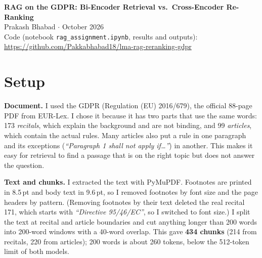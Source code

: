 \documentclass[10pt,a4paper]{article}
\newcommand{\q}[1]{\textit{``#1''}}
\begin{document}
\begin{center}
{\Large\bfseries RAG on the GDPR: Bi-Encoder Retrieval vs.\ Cross-Encoder Re-Ranking}\\[4pt]
Prakash Bhabad \quad$\cdot$ October 2026\\[2pt]
{\small Code (notebook \texttt{rag\_assignment.ipynb}, results and outputs): \url{https://github.com/Pakkabhabad18/lma-rag-reranking-gdpr}}
\end{center}

\section*{Setup}

\textbf{Document.} I used the GDPR (Regulation (EU) 2016/679), the official 88-page PDF from EUR-Lex.
I chose it because it has two parts that use the same words: 173 \emph{recitals}, which explain the background and are not binding, and 99 \emph{articles}, which contain the actual rules.
Many articles also put a rule in one paragraph and its exceptions (\q{Paragraph 1 shall not apply if\ldots}) in another.
This makes it easy for retrieval to find a passage that is on the right topic but does not answer the question.

\textbf{Text and chunks.} I extracted the text with PyMuPDF.
Footnotes are printed in 8.5\,pt and body text in 9.6\,pt, so I removed footnotes by font size and the page headers by pattern.
(Removing footnotes by their text deleted the real recital 171, which starts with \q{Directive 95/46/EC}, so I switched to font size.)
I split the text at recital and article boundaries and cut anything longer than 200 words into 200-word windows with a 40-word overlap.
This gave \textbf{434 chunks} (214 from recitals, 220 from articles); 200 words is about 260 tokens, below the 512-token limit of both models.
\end{document}
